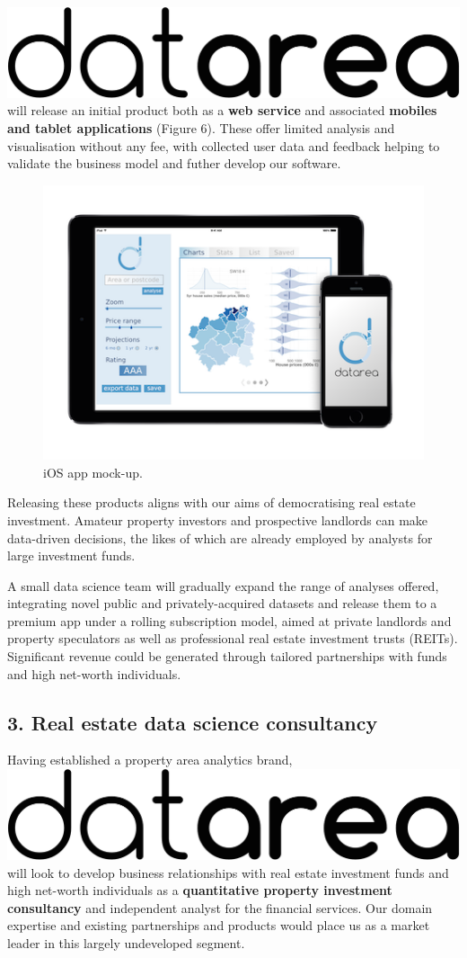 \documentclass[
10pt, %
a4paper, %
oneside, %
headinclude,footinclude, %
BCOR5mm, %
]{scrartcl}
\newcommand*{\logo}{\includegraphics[scale=.04]{Figures/logotext.png}}
\begin{document}
\logo \hspace{.1em} will release an initial product both as a {\bf web
  service} and associated {\bf mobiles and tablet applications}
(Figure 6). These
offer limited analysis and visualisation without any fee, with
collected user data and feedback helping to validate the business
model and futher develop our software.

\begin{figure}
\vspace{.5em}
\centering
\includegraphics[width=.42\textwidth]{Figures/mockup.png}
\caption{ iOS app mock-up.}
\end{figure}

Releasing these products aligns with our aims of democratising real
estate investment. Amateur property investors and prospective
landlords can make data-driven decisions, the likes of which are 
already employed by analysts for large investment funds. 

A small data science team will gradually expand the range of analyses
offered, integrating novel public and privately-acquired datasets and
release them to a premium app under a rolling subscription model,
aimed at private landlords and property speculators as well as
professional real estate investment trusts (REITs). Significant
revenue could be generated through tailored partnerships with funds
and high net-worth individuals.

\subsection*{3. Real estate data science consultancy}

Having established a property area analytics brand, \logo\hspace{.1em}
will look to develop business relationships with real estate
investment funds and high net-worth individuals as a {\bf quantitative
  property investment consultancy} and independent analyst for the
financial services. Our domain expertise and existing partnerships and
products would place us as a market leader in this largely undeveloped
segment.
\end{document}
